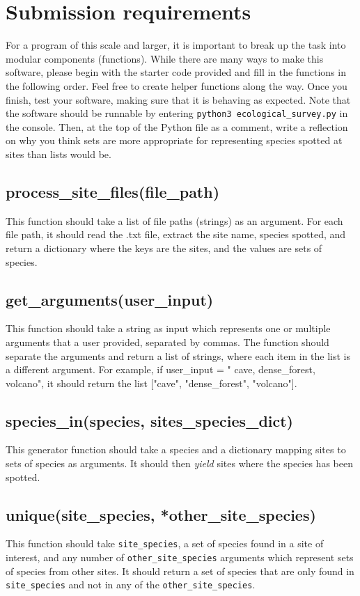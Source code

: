 \documentclass[12pt,letterpaper]{article}
\begin{document}
\section{Submission requirements}
For a program of this scale and larger, it is important to break up the task into modular components (functions). While there are many ways to make this software, please begin with the starter code provided and fill in the functions in the following order. Feel free to create helper functions along the way. Once you finish, test your software, making sure that it is behaving as expected. Note that the software should be runnable by entering \texttt{python3 ecological\_survey.py} in the console. Then, at the top of the Python file as a comment, write a reflection on why you think sets are more appropriate for representing species spotted at sites than lists would be.

\subsection{process\_site\_files(file\_path)}
This function should take a list of file paths (strings) as an argument. For each file path, it should read the .txt file, extract the site name, species spotted, and return a dictionary where the keys are the sites, and the values are sets of species.

\subsection{get\_arguments(user\_input)}
This function should take a string as input which represents one or multiple arguments that a user provided, separated by commas. The function should separate the arguments and return a list of strings, where each item in the list is a different argument. For example, if user\_input = " cave, dense\_forest, volcano", it should return the list ["cave", "dense\_forest", "volcano"].

\subsection{species\_in(species, sites\_species\_dict)}
This generator function should take a species and a dictionary mapping sites to sets of species as arguments. It should then \emph{yield} sites where the species has been spotted.

\subsection{unique(site\_species, *other\_site\_species)}
This function should take \texttt{site\_species}, a set of species found in a site of interest, and any number of \texttt{other\_site\_species} arguments which represent sets of species from other sites. It should return a set of species that are only found in \texttt{site\_species} and not in any of the \texttt{other\_site\_species}.
\end{document}
